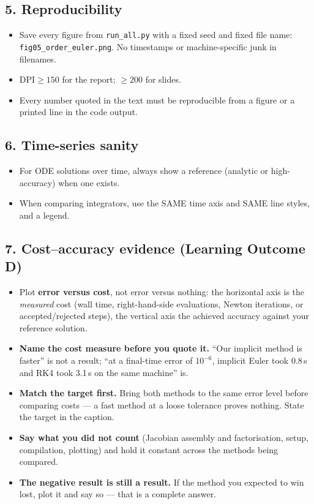 \documentclass[11pt]{article}
\begin{document}
\subsection*{5. Reproducibility}
\begin{itemize}[leftmargin=2em, itemsep=1pt]
  \item Save every figure from \texttt{run\_all.py} with a fixed seed and fixed
    file name: \texttt{fig05\_order\_euler.png}. No timestamps or
    machine-specific junk in filenames.
  \item $\mathrm{DPI} \geq 150$ for the report; $\geq 200$ for slides.
  \item Every number quoted in the text must be reproducible from a figure or a
    printed line in the code output.
\end{itemize}

\subsection*{6. Time-series sanity}
\begin{itemize}[leftmargin=2em, itemsep=1pt]
  \item For ODE solutions over time, always show a reference (analytic or
    high-accuracy) when one exists.
  \item When comparing integrators, use the SAME time axis and SAME line styles,
    and a legend.
\end{itemize}

\subsection*{7. Cost--accuracy evidence (Learning Outcome D)}
\begin{itemize}[leftmargin=2em, itemsep=1pt]
  \item Plot \textbf{error versus cost}, not error versus nothing: the horizontal
    axis is the \emph{measured} cost (wall time, right-hand-side evaluations,
    Newton iterations, or accepted/rejected steps), the vertical axis the
    achieved accuracy against your reference solution.
  \item \textbf{Name the cost measure before you quote it.} ``Our implicit
    method is faster'' is not a result; ``at a final-time error of $10^{-6}$,
    implicit Euler took 0.8\,s and RK4 took 3.1\,s on the same machine'' is.
  \item \textbf{Match the target first.} Bring both methods to the same error
    level before comparing costs --- a fast method at a loose tolerance proves
    nothing. State the target in the caption.
  \item \textbf{Say what you did not count} (Jacobian assembly and
    factorisation, setup, compilation, plotting) and hold it constant across the
    methods being compared.
  \item \textbf{The negative result is still a result.} If the method you
    expected to win lost, plot it and say so --- that is a complete answer.
\end{itemize}
\end{document}
